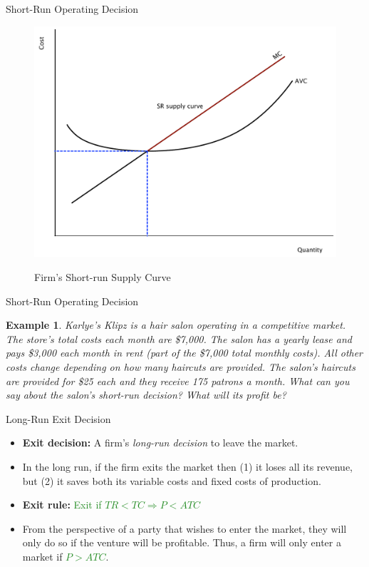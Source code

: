 \documentclass[xcolor={dvipsnames},pdf, hyperref={colorlinks=true, citecolor=ForestGreen, linkcolor=BlueViolet, urlcolor=Magenta}, handout]{beamer}
\newtheorem{exmp}{Example}[section]
\newcommand{\defn}[1]{\textbf{#1}}
\newcommand{\ddp}[1]{{\textcolor{ForestGreen}{#1}}}
\newcommand{\dd}[1]{{\underline{\textcolor{ForestGreen}{#1}}}}
\begin{document}
\begin{frame}[b]{Short-Run Operating Decision}
		\begin{figure}[H]
			\centering
			\ddp{	\includegraphics[scale=.3]{plot64.pdf}}
			\caption{Firm's Short-run Supply Curve}
		\end{figure}
		
\end{frame}

\begin{frame}{Short-Run Operating Decision}
	\begin{exmp} 
	Karlye's Klipz is a hair salon operating in a competitive market. The store's total costs each month are \$7,000. The salon has a yearly lease and pays \$3,000 each month in rent (part of the \$7,000 total monthly costs). All other costs change depending on how many haircuts are provided. The salon's haircuts are provided for \$25 each and they receive 175 patrons a month. What can you say about the salon's short-run decision? What will its profit be?
\end{exmp}
\pause \ddp{$FC = 3,000$, $VC = 4000$.\\
	 $AVC = 4000/175 = \$22.86 < P$, so stay open. \\
	 $\Pi = \$25 \times 175 - \$7,000 = -\$2,625.$ Profit if firms shuts down = -$\$3,000$.}
\end{frame}

\begin{frame}{Long-Run Exit Decision}
\begin{itemize}
	\item 	\defn{Exit decision:} A firm's \textit{long-run decision} to leave the market.
	\item In the long run, if the firm exits the market then (1) it loses all its revenue, but (2) it saves both its variable costs and fixed costs of production. 
	\item \defn{Exit rule:} \ddp{Exit if $TR < TC \Rightarrow P < ATC$}
	\item From the perspective of a party that wishes to enter the market, they will only do so if the venture will be profitable. Thus, a firm will only enter a market if \dd{$P > ATC$}.
\end{itemize}
\end{frame}
\end{document}
